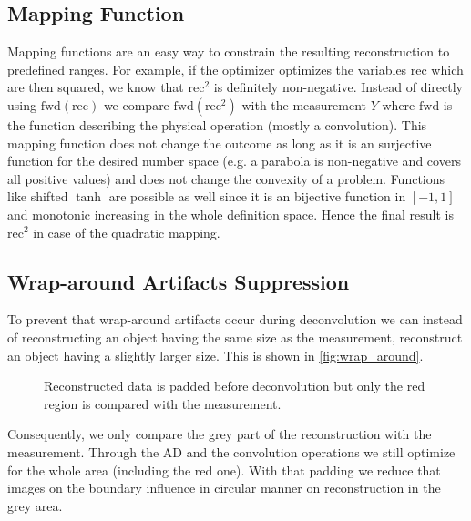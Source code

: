\documentclass{juliacon}
\begin{document}
\subsection{Mapping Function}
    Mapping functions are an easy way to constrain the resulting reconstruction to predefined ranges.
    For example, if the optimizer optimizes the variables $\text{rec}$ which are then squared, we know that
    $\text{rec}^2$ is definitely non-negative. Instead of directly using $\text{fwd}(\text{rec})$ we compare
    $\text{fwd}(\text{rec}^2)$ with the measurement $Y$ where $\text{fwd}$ is the function describing the physical operation (mostly 
            a convolution). 
    This mapping function does not change the outcome as long
    as it is an surjective function for the desired number space (e.g. a parabola is non-negative and covers all positive values) 
    and does not change the convexity of a problem.
    Functions like shifted $\tanh$ are possible as well since it is an bijective function in $[-1, 1]$ and monotonic increasing
    in the whole definition space.
    Hence the final result is $\text{rec}^2$ in case of the quadratic mapping.

\subsection{Wrap-around Artifacts Suppression}
    \label{sec:wrap}
    To prevent that wrap-around artifacts occur during deconvolution we can instead
    of reconstructing an object having the same size as the measurement, reconstruct
    an object having a slightly larger size. This is shown in \autoref{fig:wrap_around}.
    \begin{figure}[h]
        \centering
        \caption{Reconstructed data is padded before deconvolution but only the red region is compared with the measurement.}
        \label{fig:wrap_around}
    \end{figure}
    Consequently, we only compare the grey part of the reconstruction with the measurement.
    Through the AD and the convolution operations we still optimize for the whole area (including the red one).
    With that padding we reduce that images on the boundary influence in circular manner on reconstruction in the grey area.
\end{document}
